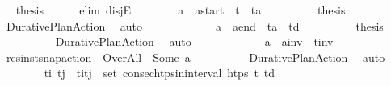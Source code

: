 \begin{isabellebody}
\ \isamarkupfalse%
\ {\isacharquery}{\kern0pt}thesis\isanewline
\ \ \ \ \isamarkupfalse%
\ {\isacharparenleft}{\kern0pt}elim\ disjE{\isacharparenright}{\kern0pt}\isanewline
\ \ \ \ \ \ \isamarkupfalse%
\ {\isachardoublequoteopen}a\ {\isacharequal}{\kern0pt}\ {\isacharquery}{\kern0pt}a\isactrlsub s\isactrlsub t\isactrlsub a\isactrlsub r\isactrlsub t\ {\isasymand}\ t\isactrlsub {\isasympi}\ {\isacharequal}{\kern0pt}\ t\isactrlsub a{\isachardoublequoteclose}\isanewline
\ \ \ \ \ \ \isamarkupfalse%
\ \isamarkupfalse%
\ {\isacharquery}{\kern0pt}thesis\isanewline
\ \ \ \ \ \ \ \ \isamarkupfalse%
\ Durative{\isacharunderscore}{\kern0pt}Plan{\isacharunderscore}{\kern0pt}Action\ \isamarkupfalse%
\ auto\isanewline
\ \ \ \ \isamarkupfalse%
\isanewline
\ \ \ \ \ \ \isamarkupfalse%
\ {\isachardoublequoteopen}a\ {\isacharequal}{\kern0pt}\ {\isacharquery}{\kern0pt}a\isactrlsub e\isactrlsub n\isactrlsub d\ {\isasymand}\ t\isactrlsub a\ {\isacharequal}{\kern0pt}\ t\isactrlsub {\isasympi}{\isacharplus}{\kern0pt}d{\isachardoublequoteclose}\isanewline
\ \ \ \ \ \ \isamarkupfalse%
\ \isamarkupfalse%
\ {\isacharquery}{\kern0pt}thesis\isanewline
\ \ \ \ \ \ \ \ \isamarkupfalse%
\ Durative{\isacharunderscore}{\kern0pt}Plan{\isacharunderscore}{\kern0pt}Action\ \isamarkupfalse%
\ auto\isanewline
\ \ \ \ \isamarkupfalse%
\isanewline
\ \ \ \ \ \ \isamarkupfalse%
\ {\isachardoublequoteopen}a\ {\isacharequal}{\kern0pt}\ {\isacharquery}{\kern0pt}a\isactrlsub i\isactrlsub n\isactrlsub v\ {\isasymand}\ {\isacharquery}{\kern0pt}t\isactrlsub i\isactrlsub n\isactrlsub v{\isachardoublequoteclose}\isanewline
\ \ \ \ \ \ \isamarkupfalse%
\ \isamarkupfalse%
\ {\isachardoublequoteopen}res{\isacharunderscore}{\kern0pt}inst{\isacharunderscore}{\kern0pt}snap{\isacharunderscore}{\kern0pt}action\ {\isasympi}\ Over{\isacharunderscore}{\kern0pt}All\ {\isacharequal}{\kern0pt}\ Some\ a{\isachardoublequoteclose}\isanewline
\ \ \ \ \ \ \ \ \isamarkupfalse%
\ Durative{\isacharunderscore}{\kern0pt}Plan{\isacharunderscore}{\kern0pt}Action\ \isamarkupfalse%
\ auto\isanewline
\ \ \ \ \ \ \isamarkupfalse%
\ t\isactrlsub i\ t\isactrlsub j\ \ {\isachardoublequoteopen}{\isacharparenleft}{\kern0pt}t\isactrlsub i{\isacharcomma}{\kern0pt}t\isactrlsub j{\isacharparenright}{\kern0pt}\ {\isasymin}\ set\ {\isacharparenleft}{\kern0pt}consec{\isacharunderscore}{\kern0pt}htps{\isacharunderscore}{\kern0pt}in{\isacharunderscore}{\kern0pt}interval\ {\isacharquery}{\kern0pt}htps\ t\isactrlsub {\isasympi}\ {\isacharparenleft}{\kern0pt}t\isactrlsub {\isasympi}{\isacharplus}{\kern0pt}d{\isacharparenright}{\kern0pt}{\isacharparenright}{\kern0pt}{\isachardoublequoteclose}\ \isanewline

\end{isabellebody}
